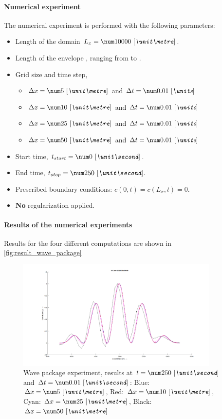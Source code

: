 \paragraph*{Numerical experiment}
The numerical experiment is performed with the following parameters:
\begin{itemize}
    \item Length of the domain $L_x = \bqty{10000}{\metre}$.
    \item Length of the envelope , ranging from  to .
    \item Grid size and time step,
    \begin{itemize}
        \item $\Dx = \bqty{5}{\metre}$ and $\Dt = \bqty{0.01}{s}$
        \item $\Dx = \bqty{10}{\metre}$ and $\Dt = \bqty{0.01}{s}$
        \item $\Dx = \bqty{25}{\metre}$ and $\Dt = \bqty{0.01}{s}$
        \item $\Dx = \bqty{50}{\metre}$ and $\Dt = \bqty{0.01}{s}$
    \end{itemize}
    \item Start time, $t_{start} = \bqty{0}{\second}$.
    \item End time, $t_{stop} = \bqty{250}{\second}$.
    \item Prescribed boundary conditions: $c(0,t) = c(L_x,t) = 0$.
    \item \textbf{No} regularization applied.
\end{itemize}
\paragraph*{Results of the numerical experiments}
Results for the four different computations are shown in \autoref{fig:result_wave_package}
\begin{figure}[H]
    \centering
    \includegraphics[width=0.9\textwidth]{figures/wave_package_250s.png}
    \caption[Wave package experiment]{Wave package experiment, results at $t=\bqty{250}{\second}$ and $\Dt = \bqty{0.01}{\second}$:
        Blue: $\Dx = \bqty{5}{\metre}$,
        Red: $\Dx = \bqty{10}{\metre}$,
        Cyan: $\Dx = \bqty{25}{\metre}$,
        Black: $\Dx = \bqty{50}{\metre}$
    }
    \label{fig:result_wave_package}
\end{figure}


